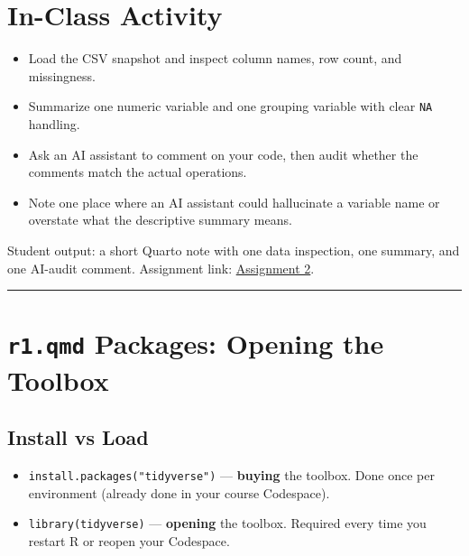 \documentclass[
  letterpaper,
  DIV=11,
  numbers=noendperiod,
  oneside]{scrreprt}
\providecommand{\tightlist}{%
  \setlength{\itemsep}{0pt}\setlength{\parskip}{0pt}}
\begin{document}
\section*{In-Class Activity}\label{in-class-activity-2}


\begin{itemize}
\tightlist
\item
  Load the CSV snapshot and inspect column names, row count, and
  missingness.
\item
  Summarize one numeric variable and one grouping variable with clear
  \texttt{NA} handling.
\item
  Ask an AI assistant to comment on your code, then audit whether the
  comments match the actual operations.
\item
  Note one place where an AI assistant could hallucinate a variable name
  or overstate what the descriptive summary means.
\end{itemize}

Student output: a short Quarto note with one data inspection, one
summary, and one AI-audit comment. Assignment link:
\href{../../assignments/assignment02-r-with-ai/README.md}{Assignment 2}.

\begin{center}\rule{0.5\linewidth}{0.5pt}\end{center}

\section*{\texorpdfstring{\texttt{r1.qmd} Packages: Opening the
Toolbox}{r1.qmd Packages: Opening the Toolbox}}\label{r1.qmd-packages-opening-the-toolbox}


\subsection*{Install vs Load}\label{install-vs-load}

\begin{itemize}
\tightlist
\item
  \texttt{install.packages("tidyverse")} --- \textbf{buying} the
  toolbox. Done once per environment (already done in your course
  Codespace).
\item
  \texttt{library(tidyverse)} --- \textbf{opening} the toolbox. Required
  every time you restart R or reopen your Codespace.
\end{itemize}
\end{document}
